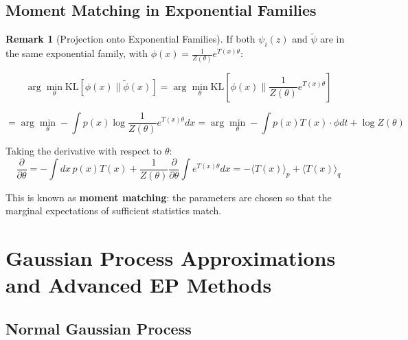 \documentclass[12pt,a4paper]{article}
\theoremstyle{definition}
\newtheorem{remark}{Remark}[section]
\begin{document}
\subsection{Moment Matching in Exponential Families}

\begin{remark}[Projection onto Exponential Families]
If both $\psi_i(z)$ and $\tilde{\psi}$ are in the same exponential family, with $\phi(x) = \frac{1}{Z(\theta)} e^{T(x) \theta}$:

\[
\arg\min_\theta \text{KL}[\phi(x) \| \tilde{\phi}(x)] = \arg\min_\theta \text{KL}\left[\phi(x) \bigg\| \frac{1}{Z(\theta)} e^{T(x)\theta}\right]
\]

\[
= \arg\min_\theta -\int p(x) \log \frac{1}{Z(\theta)} e^{T(x)\theta} dx = \arg\min_\theta - \int p(x) T(x) \cdot \phi dt + \log Z(\theta)
\]

Taking the derivative with respect to $\theta$:
\[
\frac{\partial}{\partial \theta} = -\int dx \, p(x) T(x) + \frac{1}{Z(\theta)} \frac{\partial}{\partial \theta} \int e^{T(x)\theta} dx = -\langle T(x) \rangle_p + \langle T(x) \rangle_q
\]

This is known as \textbf{moment matching}: the parameters are chosen so that the marginal expectations of sufficient statistics match.
\end{remark}

\newpage

\section{Gaussian Process Approximations and Advanced EP Methods}

\subsection{Normal Gaussian Process}
\end{document}
